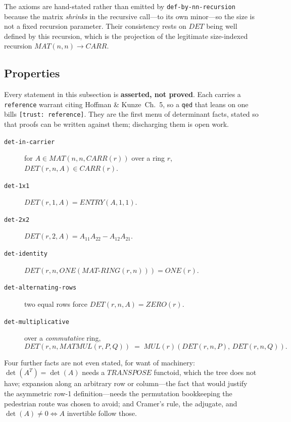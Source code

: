 The axioms are hand-stated rather than emitted by
\texttt{def-by-nn-recursion} because the matrix \emph{shrinks} in the
recursive call---to its own minor---so the size is not a fixed recursion
parameter.  Their consistency rests on $\mathit{DET}$ being well defined
by this recursion, which is the projection of the legitimate
size-indexed recursion $\mathit{MAT}(n,n) \to \mathit{CARR}$.

\subsection{Properties}

\begin{remark}
Every statement in this subsection is \textbf{asserted, not proved}.
Each carries a \texttt{reference} warrant citing Hoffman \&
Kunze~Ch.~5, so a \texttt{qed} that leans on one bills
\texttt{[trust: reference]}.  They are the first menu of determinant
facts, stated so that proofs can be written against them; discharging
them is open work.
\end{remark}

\begin{description}
\item[\texttt{det-in-carrier}]
  for $A \in \mathit{MAT}(n,n,\mathit{CARR}(r))$ over a ring $r$,
  $\mathit{DET}(r,n,A) \in \mathit{CARR}(r)$.

\item[\texttt{det-1x1}]
  $\mathit{DET}(r,1,A) = \mathit{ENTRY}(A,1,1)$.

\item[\texttt{det-2x2}]
  $\mathit{DET}(r,2,A) = A_{11}A_{22} - A_{12}A_{21}$.

\item[\texttt{det-identity}]
  $\mathit{DET}(r, n, \mathit{ONE}(\mathit{MAT\text{-}RING}(r,n)))
   = \mathit{ONE}(r)$.

\item[\texttt{det-alternating-rows}]
  two equal rows force $\mathit{DET}(r,n,A) = \mathit{ZERO}(r)$.

\item[\texttt{det-multiplicative}]
  over a \emph{commutative} ring,
  \[
    \mathit{DET}(r,n,\mathit{MATMUL}(r,P,Q)) \;=\;
    \mathit{MUL}(r)(\mathit{DET}(r,n,P),\, \mathit{DET}(r,n,Q)).
  \]
\end{description}

\begin{remark}
Four further facts are not even stated, for want of machinery:
$\det(A^{T}) = \det(A)$ needs a $\mathit{TRANSPOSE}$ functoid, which the
tree does not have; expansion along an arbitrary row or column---the
fact that would justify the asymmetric row-1 definition---needs the
permutation bookkeeping the pedestrian route was chosen to avoid; and
Cramer's rule, the adjugate, and
$\det(A) \ne 0 \Leftrightarrow A$ invertible follow those.
\end{remark}


